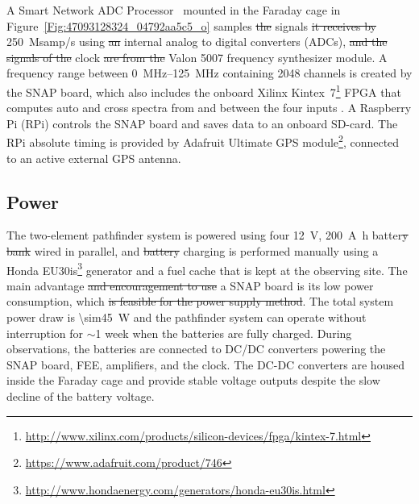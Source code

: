 A Smart Network ADC Processor~\citep[SNAP;][]{2016JAI.....541001H} mounted in the Faraday cage in Figure~\ref{Fig:47093128324_04792aa5c5_o} samples \st{the}  signals \st{it receives by}  \SI{250}{Msamp/s} using \st{an} internal analog to digital converters (ADCs), \st{and the signals of the}  clock  \st{are from the} Valon 5007 frequency synthesizer module. A frequency range between \SIrange{0}{125}{\mega\hertz} containing 2048 channels is created by the SNAP board, which also includes the onboard Xilinx Kintex~7\footnote{\url{http://www.xilinx.com/products/silicon-devices/fpga/kintex-7.html}} FPGA that computes auto and cross spectra from and between the four inputs . A Raspberry Pi (RPi) controls the SNAP board and saves data  to an onboard SD-card. The RPi absolute timing is provided by Adafruit Ultimate GPS module\footnote{\url{https://www.adafruit.com/product/746}}, connected
to an active external GPS antenna.

\subsection{Power}
The two-element pathfinder system is powered using four \SI{12}{\volt}, \SI{200}{\ampere\hour} batter\st{y bank} wired in parallel, and \st{battery} charging is performed manually using a Honda EU30is\footnote {\url{http://www.hondaenergy.com/generators/honda-eu30is.html}} generator and a fuel cache that is kept at the observing site. The main advantage \st{and encouragement to use}  a SNAP board is its low power consumption, which  \st{is feasible for the power supply method}. The total system power draw is \SI{\sim45}{\watt} and the pathfinder system can operate without interruption for $\sim$1 week when the batteries are fully charged.  During observations, the batteries are connected to DC/DC converters powering the SNAP board, FEE, amplifiers, and the clock. The DC-DC converters are housed inside the Faraday cage and provide stable voltage outputs	despite the slow decline of the battery voltage. 

